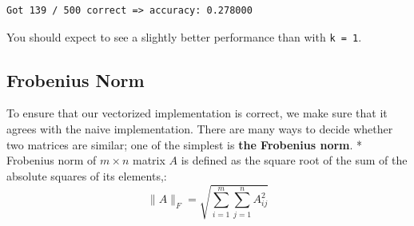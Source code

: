\documentclass[11pt]{article}
\begin{document}
    \begin{Verbatim}[commandchars=\\\{\}]
Got 139 / 500 correct => accuracy: 0.278000

    \end{Verbatim}

    You should expect to see a slightly better performance than with
\texttt{k\ =\ 1}.

    \hypertarget{frobenius-norm}{%
\subsection{Frobenius Norm}\label{frobenius-norm}}

To ensure that our vectorized implementation is correct, we make sure
that it agrees with the naive implementation. There are many ways to
decide whether two matrices are similar; one of the simplest is
\textbf{the Frobenius norm}. * Frobenius norm of \(m\times n\) matrix
\(A\) is defined as the square root of the sum of the absolute squares
of its elements,:
\[\|A\|_F=\sqrt{\sum\limits_{i=1}^m\sum\limits_{j=1}^nA_{ij}^2}\]
\end{document}
